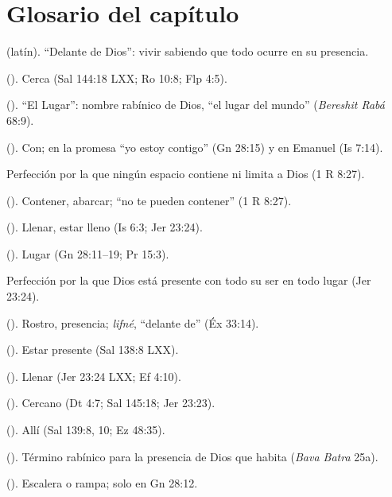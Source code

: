 \section*{Glosario del capítulo}
\begin{description}\setlength{\itemsep}{2pt}
\item[\emph{Coram Deo}] (latín). ``Delante de Dios'': vivir sabiendo que todo ocurre en su presencia.
\item[\emph{Engýs}] (). Cerca (Sal 144:18 LXX; Ro 10:8; Flp 4:5).
\item[\emph{HaMaqom}] (). ``El Lugar'': nombre rabínico de Dios, ``el lugar del mundo'' (\emph{Bereshit Rabá} 68:9).
\item[\emph{Im}] (). Con; en la promesa ``yo estoy contigo'' (Gn 28:15) y en Emanuel (Is 7:14).
\item[Inmensidad] Perfección por la que ningún espacio contiene ni limita a Dios (1 R 8:27).
\item[\emph{Kul}] (). Contener, abarcar; ``no te pueden contener'' (1 R 8:27).
\item[\emph{Male'}] (). Llenar, estar lleno (Is 6:3; Jer 23:24).
\item[\emph{Maqom}] (). Lugar (Gn 28:11--19; Pr 15:3).
\item[Omnipresencia] Perfección por la que Dios está presente con todo su ser en todo lugar (Jer 23:24).
\item[\emph{Panim}] (). Rostro, presencia; \emph{lifné}, ``delante de'' (Éx 33:14).
\item[\emph{Páreimi}] (). Estar presente (Sal 138:8 LXX).
\item[\emph{Plēróō}] (). Llenar (Jer 23:24 LXX; Ef 4:10).
\item[\emph{Qarov}] (). Cercano (Dt 4:7; Sal 145:18; Jer 23:23).
\item[\emph{Sham}] (). Allí (Sal 139:8, 10; Ez 48:35).
\item[Shejiná] (). Término rabínico para la presencia de Dios que habita (\emph{Bava Batra} 25a).
\item[\emph{Sullam}] (). Escalera o rampa; solo en Gn 28:12.
\end{description}

